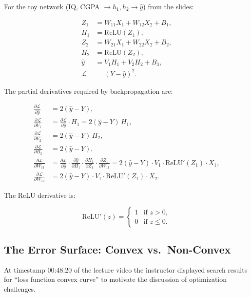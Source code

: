 \documentclass[12pt,a4paper]{article}
\newcommand{\pd}[2]{\frac{\partial #1}{\partial #2}}
\begin{document}
For the toy network (IQ, CGPA $\to h_1, h_2 \to \hat{y}$) from the slides:

\begin{align}
  Z_1 &= W_{11}X_1 + W_{12}X_2 + B_1,\\
  H_1 &= \text{ReLU}(Z_1),\\
  Z_2 &= W_{21}X_1 + W_{22}X_2 + B_2,\\
  H_2 &= \text{ReLU}(Z_2),\\
  \hat{y} &= V_1 H_1 + V_2 H_2 + B_3,\\
  \mathcal{L} &= (Y - \hat{y})^{2}.
\end{align}

The partial derivatives required by backpropagation are:

\begin{align}
  \pd{\mathcal{L}}{\hat{y}} &= 2(\hat{y} - Y),
  \label{eq:dl-dyhat}\\
  \pd{\mathcal{L}}{V_1} &= \pd{\mathcal{L}}{\hat{y}}\cdot H_1
    = 2(\hat{y}-Y)\,H_1,\\
  \pd{\mathcal{L}}{V_2} &= 2(\hat{y}-Y)\,H_2,\\
  \pd{\mathcal{L}}{B_3} &= 2(\hat{y}-Y),\\
  \pd{\mathcal{L}}{W_{11}} &=
    \pd{\mathcal{L}}{\hat{y}}\cdot\pd{\hat{y}}{H_1}
    \cdot\pd{H_1}{Z_1}\cdot\pd{Z_1}{W_{11}}
    = 2(\hat{y}-Y)\cdot V_1\cdot\text{ReLU}'(Z_1)\cdot X_1,
  \label{eq:dl-dw11}\\
  \pd{\mathcal{L}}{W_{12}} &= 2(\hat{y}-Y)\cdot V_1\cdot\text{ReLU}'(Z_1)\cdot X_2.
\end{align}

The ReLU derivative is:

\begin{equation}
  \text{ReLU}'(z) =
  \begin{cases}
    1 & \text{if } z > 0,\\
    0 & \text{if } z \leq 0.
  \end{cases}
  \label{eq:relu-deriv}
\end{equation}

\subsection{The Error Surface: Convex vs.\ Non-Convex}
\label{sub:error-surface}

At timestamp 00:48:20 of the lecture video the instructor displayed search
results for ``loss function convex curve'' to motivate the discussion of
optimization challenges.
\end{document}
